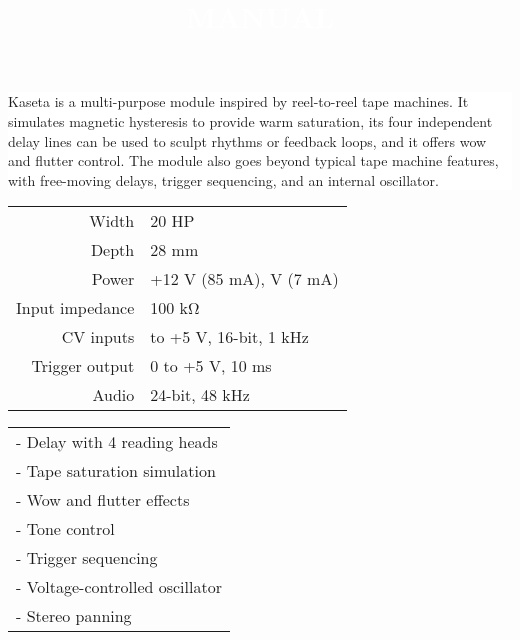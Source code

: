 \documentclass[11pt]{article}
\begin{document}
\pagecolor{black}\afterpage{\nopagecolor}

\title{\textcolor{white}{MANUAL}}
\author{}
\date{}

\begin{minipage}{0.4\textwidth}
\color{white}
\maketitle

\noindent\colorbox{white}
{
\begin{minipage}{0.85\textwidth}\color{black}
Kaseta is a multi-purpose module inspired by reel-to-reel tape machines. It
simulates magnetic hysteresis to provide warm saturation, its four independent
delay lines can be used to sculpt rhythms or feedback loops, and it offers wow
and flutter control. The module also goes beyond typical tape machine features,
with free-moving delays, trigger sequencing, and an internal oscillator.
\end{minipage}
}

\vspace{1cm}

\begin{minipage}{0.8\textwidth}\color{white}
\begin{tabular}{@{}rl@{}}
  Width & 20 HP \\
  Depth & 28 mm \\
  Power & +12 V (85 mA), \textminus12 V (7 mA) \\
  Input impedance & 100 kΩ \\
  CV inputs & \textminus5 to +5 V, 16-bit, 1 kHz \\
  Trigger output & 0 to +5 V, 10 ms \\
  Audio & 24-bit, 48 kHz
\end{tabular}
\end{minipage}

\vspace{1cm}

\begin{minipage}{0.8\textwidth}\color{white}
\begin{tabular}{@{}l}
  - Delay with 4 reading heads \\
  - Tape saturation simulation \\
  - Wow and flutter effects \\
  - Tone control \\
  - Trigger sequencing \\
  - Voltage-controlled oscillator \\
  - Stereo panning
\end{tabular}
\end{minipage}

\end{minipage}%
\end{document}
